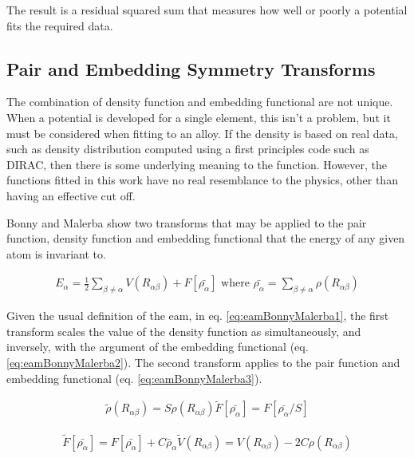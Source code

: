 The result is a residual squared sum that measures how well or poorly a potential fits the required data.


\subsection{Pair and Embedding Symmetry Transforms}
\label{section:pairembeddingsym}

The combination of density function and embedding functional are not unique.  When a potential is developed for a single element, this isn't a problem, but it must be considered when fitting to an alloy.  If the density is based on real data, such as density distribution computed using a first principles code such as DIRAC, then there is some underlying meaning to the function.  However, the functions fitted in this work have no real resemblance to the physics, other than having an effective cut off.  

Bonny and Malerba\cite{bonnymalerba} show two transforms that may be applied to the pair function, density function and embedding functional that the energy of any given atom is invariant to.

\begin{equation}
\begin{split}
E_{\alpha} = \frac{1}{2} \sum_{\beta \neq \alpha} V(R_{\alpha \beta}) + F[\bar{\rho_{\alpha}}]
\text{ where } \bar{\rho_{\alpha}} = \sum_{\beta \neq \alpha} \rho(R_{\alpha \beta})
\end{split}
\label{eq:eamBonnyMalerba1}
\end{equation}

Given the usual definition of the \acrshort{eam}, in eq. \ref{eq:eamBonnyMalerba1}, the first transform scales the value of the density function as simultaneously, and inversely, with the argument of the embedding functional (eq. \ref{eq:eamBonnyMalerba2}).  The second transform applies to the pair function and embedding functional (eq. \ref{eq:eamBonnyMalerba3}).

\begin{equation}
\begin{split}
\tilde{\rho}(R_{\alpha \beta}) = S \rho(R_{\alpha \beta})
\tilde{F}[\bar{\rho_{\alpha}}] = F[\bar{\rho_{\alpha}}/S]
\end{split}
\label{eq:eamBonnyMalerba2}
\end{equation}

\begin{equation}
\begin{split}
\tilde{F}[\bar{\rho_{\alpha}}] = F[\bar{\rho_{\alpha}}] + C \bar{\rho}_{\alpha}
\tilde{V}(R_{\alpha \beta}) = V(R_{\alpha \beta}) - 2 C \rho(R_{\alpha \beta})
\end{split}
\label{eq:eamBonnyMalerba3}
\end{equation}

